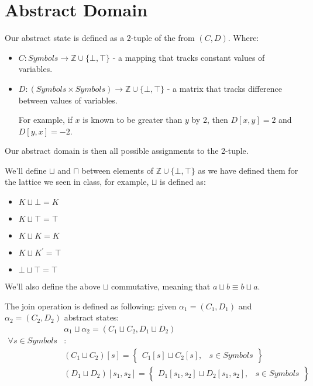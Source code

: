 \section*{Abstract Domain}
Our abstract state is defined as a 2-tuple of the from $(C,D)$. Where:
\begin{itemize}
	\item $C: Symbols \rightarrow \mathbb{Z}\cup \{\bot, \top\}$ - a mapping that tracks constant values of variables.
	\item $D: (Symbols \times Symbols )\rightarrow \mathbb{Z}\cup \{\bot, \top\}$ - a matrix that tracks difference between values of variables.
	
	For example, if $x$ is known to be greater than $y$ by 2, then $D[x,y] = 2$ and $D[y,x] = -2$.

\end{itemize}
Our abstract domain is then all possible assignments to the 2-tuple.

We'll define $\sqcup$ and $\sqcap$ between elements of $\mathbb{Z}\cup \{\bot, \top\}$ as we have defined them for the lattice we seen in class, for example, $\sqcup$ is defined as:
\begin{itemize}
	\item $K \sqcup \bot = K$
	\item $K \sqcup \top = \top$
	\item $K \sqcup K = K$
	\item $K \sqcup K^\prime = \top$
	\item $\bot \sqcup \top = \top$
\end{itemize}
We'll also define the above $\sqcup$ commutative, meaning that $a\sqcup b \equiv b \sqcup a$.

The join operation is defined as following: given $\alpha_1=(C_1, D_1)$ and $\alpha_2=(C_2,D_2)$ abstract states:
\begin{align*}
&\alpha_1\sqcup\alpha_2=(C_1\sqcup C_2, D_1 \sqcup D_2) \\
\forall s \in Symbols&:  \\
&(C_1\sqcup C_2)[s] = \left.
	\begin{cases}
		C_1[s]\sqcup C_2[s], & s \in Symbols
	\end{cases}
\right\} \\
&(D_1\sqcup D_2)[s_1, s_2] = \left.
	\begin{cases}
		D_1[s_1, s_2]\sqcup D_2[s_1, s_2], & s \in Symbols
	\end{cases}
\right\}
\end{align*}

